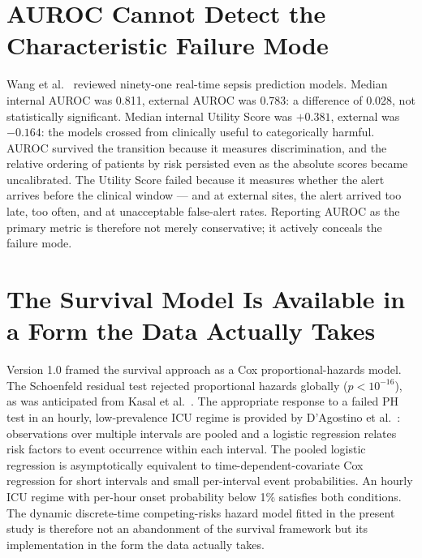 \section{AUROC Cannot Detect the Characteristic Failure Mode}

Wang et al.\ \parencite{wang2025srpm} reviewed ninety-one real-time sepsis
prediction models. Median internal AUROC was 0.811, external AUROC was 0.783:
a difference of 0.028, not statistically significant. Median internal Utility
Score was $+0.381$, external was $-0.164$: the models crossed from clinically
useful to categorically harmful. AUROC survived the transition because it
measures discrimination, and the relative ordering of patients by risk persisted
even as the absolute scores became uncalibrated. The Utility Score failed because
it measures whether the alert arrives before the clinical window --- and at external
sites, the alert arrived too late, too often, and at unacceptable false-alert rates.
Reporting AUROC as the primary metric is therefore not merely conservative; it
actively conceals the failure mode.

\section{The Survival Model Is Available in a Form the Data Actually Takes}

Version 1.0 framed the survival approach as a Cox proportional-hazards model.
The Schoenfeld residual test rejected proportional hazards globally ($p < 10^{-16}$),
as was anticipated from Kasal et al.\ \parencite{kasal2004cox}. The appropriate
response to a failed PH test in an hourly, low-prevalence ICU regime is provided
by D'Agostino et al.\ \parencite{dagostino1990pooled}: observations over multiple
intervals are pooled and a logistic regression relates risk factors to event
occurrence within each interval. The pooled logistic regression is asymptotically
equivalent to time-dependent-covariate Cox regression for short intervals and small
per-interval event probabilities. An hourly ICU regime with per-hour onset
probability below 1\% satisfies both conditions. The dynamic discrete-time
competing-risks hazard model fitted in the present study is therefore not an
abandonment of the survival framework but its implementation in the form the data
actually takes.

